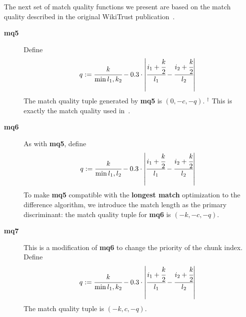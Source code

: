 The next set of match quality functions we present are
based on the match quality described in the
original WikiTrust publication~\cite{Adler2007}.
%
\begin{description}

\item[\textbf{mq5}]
    Define
    \begin{equation*}
    q := \cfrac{k}{\min{l_1, k_2}} - 0.3 \cdot
        \left|\cfrac{ i_1 + \cfrac{k}{2} }{l_1}
            - \cfrac{ i_2 + \cfrac{k}{2} }{l_2} \right|
    \end{equation*}
    The match quality tuple generated by \textbf{mq5} is $(0, -c, -q)$.
    ${}^\dagger$
    This is exactly the match quality used in~\cite{Adler2007}.

\item[\textbf{mq6}]
    As with \textbf{mq5}, define
    \begin{equation*}
    q := \cfrac{k}{\min{l_1, l_2}} - 0.3 \cdot
        \left|\cfrac{ i_1 + \cfrac{k}{2} }{l_1}
            - \cfrac{ i_2 + \cfrac{k}{2} }{l_2} \right|
    \end{equation*}
    To make \textbf{mq5} compatible with the \textbf{longest match}
    optimization to the difference algorithm, we introduce the
    match length as the primary discriminant:
    the match quality tuple for \textbf{mq6} is $(-k, -c, -q)$.

\item[\textbf{mq7}] This is a modification of \textbf{mq6}
    to change the priority of the chunk index.
    Define
    \begin{equation*}
    q := \cfrac{k}{\min{l_1, k_2}} - 0.3 \cdot
        \left|\cfrac{ i_1 + \cfrac{k}{2} }{l_1}
            - \cfrac{ i_2 + \cfrac{k}{2} }{l_2} \right|
    \end{equation*}
    The match quality tuple is $(-k, c, -q)$.

\end{description}

